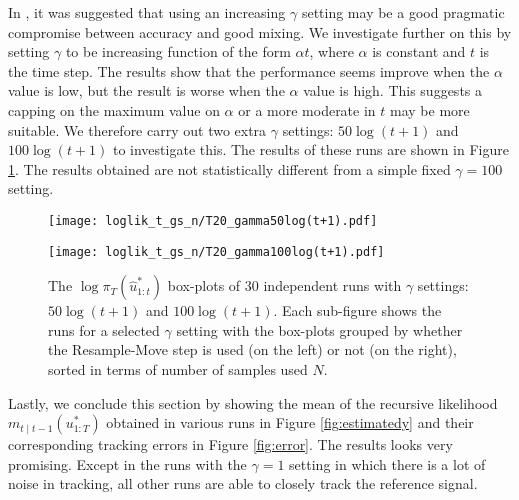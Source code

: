 In \cite{NK11}, it was suggested that using an increasing $\gamma$ setting may be a good pragmatic compromise between accuracy and good mixing. We investigate further on this by setting $\gamma$ to be increasing function of the form $\alpha t$, where $\alpha$ is constant and $t$ is the time step. The results show that the performance seems improve when the $\alpha$ value is low, but the result is worse when the $\alpha$ value is high. This suggests a capping on the maximum value on $\alpha$ or a more moderate in $t$ may be more suitable. We therefore carry out two extra $\gamma$ settings: $50\log(t+1)$ and $100\log(t+1)$ to investigate this. The results of these runs are shown in Figure \ref{fig:log}. The results obtained are not statistically different from a simple fixed $\gamma=100$ setting.

\begin{figure}[!thbp]
    \centering
    \begin{minipage}{.5\textwidth}
        \centering
        \texttt{[image: loglik\_t\_gs\_n/T20\_gamma50log(t+1).pdf]}
    \end{minipage}%
    \begin{minipage}{0.5\textwidth}
        \centering
        \texttt{[image: loglik\_t\_gs\_n/T20\_gamma100log(t+1).pdf]}
    \end{minipage}
    \caption{The $\log\pi_T(\hat{u}^*_{1:t})$ box-plots of 30 independent runs with $\gamma$ settings: $50\log(t+1)$ and $100\log(t+1)$. Each sub-figure shows the runs for a selected $\gamma$ setting with the box-plots grouped by whether the Resample-Move step is used (on the left) or not (on the right), sorted in terms of number of samples used $N$.}
    \label{fig:log}
\end{figure}

Lastly, we conclude this section by showing the mean of the recursive likelihood $m_{t \mid t-1}(u^*_{1:T})$ obtained in various runs in Figure \ref{fig:estimatedy} and their corresponding tracking errors in Figure \ref{fig:error}. The results looks very promising. Except in the runs with the $\gamma=1$ setting in which there is a lot of noise in tracking, all other runs are able to closely track the reference signal. 

